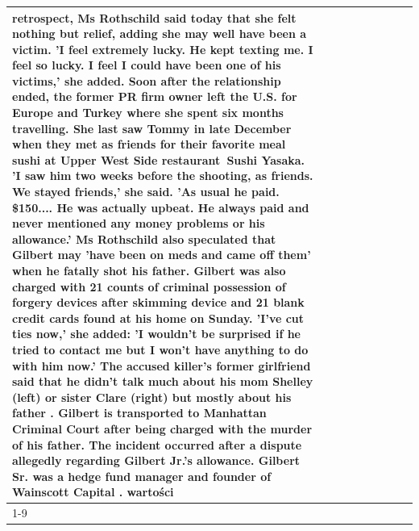 \begin{table}[H]
\begin{tabular}{lllrlllll}
retrospect, Ms Rothschild said today that she felt nothing but relief, adding she may well have been a victim. 'I feel extremely lucky. He kept texting me. I feel so lucky. I feel I could have been one of his victims,' she added. Soon after the relationship ended, the former PR firm owner left the U.S. for Europe and Turkey where she spent six months  travelling. She last saw Tommy in late December when they met as friends for their favorite meal sushi at Upper West Side restaurant Sushi Yasaka. 'I saw him two weeks before the shooting, as friends. We stayed friends,' she said. 'As usual he paid. \$150.... He was actually upbeat. He always paid and never mentioned any money problems or his allowance.' Ms Rothschild also speculated that Gilbert may 'have been on meds and came off them' when he fatally shot his father. Gilbert was also charged with 21 counts of criminal possession of forgery devices after skimming device and 21 blank credit cards found at his home on Sunday. 'I've cut ties now,' she added: 'I wouldn’t be surprised if he tried to contact me but I won’t have anything to do with him now.' The accused killer's former girlfriend said that he didn't talk much about his mom Shelley (left) or sister Clare (right) but mostly about his father . Gilbert is transported to Manhattan Criminal Court  after being charged with the murder of his father. The incident occurred after a dispute allegedly regarding Gilbert Jr.'s allowance. Gilbert Sr. was a hedge fund manager and founder of Wainscott Capital . wartości \\
\cline{1-9}

\end{tabular}
\end{table}
